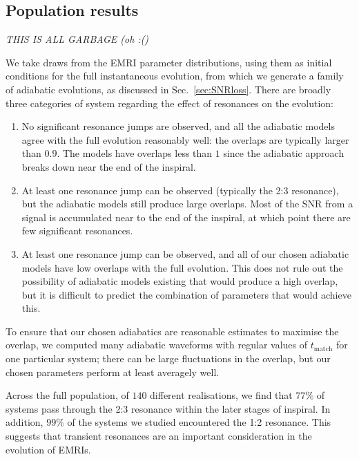 \documentclass[aps,prd,amsfonts,amssymb,amsmath,nofootinbib,showpacs,superscriptaddress,twocolumn]{revtex4}
\newcommand{\secref}[1]{Sec.\ \ref{sec:#1}}
\begin{document}
\subsection{Population results}
\label{sec:population}

\emph{THIS IS ALL GARBAGE (oh :()}

We take draws from the EMRI parameter distributions, using them as initial conditions for the full instantaneous evolution, from which we generate a family of adiabatic evolutions, as discussed in \secref{SNRloss}. There are broadly three categories of system regarding the effect of resonances on the evolution:

\begin{enumerate}
\item No significant resonance jumps are observed, and all the adiabatic models agree with the full evolution reasonably well: the overlaps are typically larger than $0.9$. The models have overlaps less than $1$ since the adiabatic approach breaks down near the end of the inspiral.

\item At least one resonance jump can be observed (typically the 2:3 resonance), but the adiabatic models still produce large overlaps. Most of the SNR from a signal is accumulated near to the end of the inspiral, at which point there are few significant resonances.

\item At least one resonance jump can be observed, and all of our chosen adiabatic models have low overlaps with the full evolution. This does not rule out the possibility of adiabatic models existing that would produce a high overlap, but it is difficult to predict the combination of parameters that would achieve this.
\end{enumerate}

To ensure that our chosen adiabatics are reasonable estimates to maximise the overlap, we computed many adiabatic waveforms with regular values of $t_\mathrm{match}$ for one particular system; there can be large fluctuations in the overlap, but our chosen parameters perform at least averagely well.

Across the full population, of $140$ different realisations, we find that $77\%$ of systems pass through the 2:3 resonance within the later stages of inspiral. In addition, $99\%$ of the systems we studied encountered the 1:2 resonance. This suggests that transient resonances are an important consideration in the evolution of EMRIs.
\end{document}
